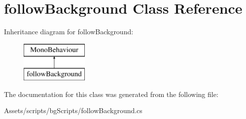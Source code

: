 \hypertarget{classfollow_background}{}\section{follow\+Background Class Reference}
\label{classfollow_background}
Inheritance diagram for follow\+Background\+:\begin{figure}[H]
\begin{center}
\leavevmode
\includegraphics[height=2.000000cm]{classfollow_background}
\end{center}
\end{figure}


The documentation for this class was generated from the following file\+:\begin{DoxyCompactItemize}
\item 
Assets/scripts/bg\+Scripts/follow\+Background.\+cs\end{DoxyCompactItemize}

